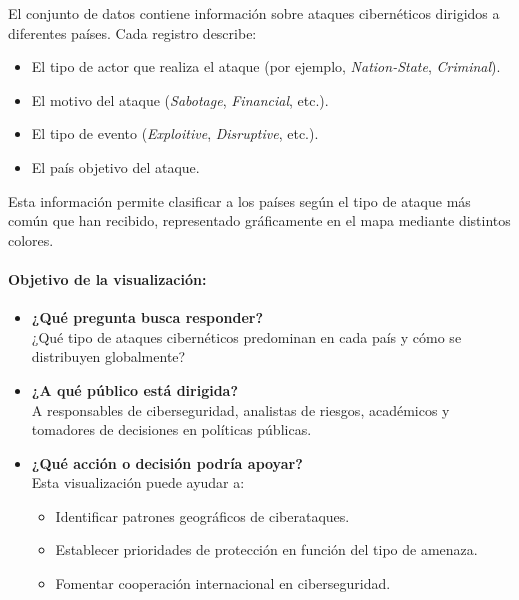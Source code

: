 \documentclass[12pt, a4paper]{article}
\begin{document}
El conjunto de datos contiene información sobre ataques cibernéticos dirigidos a diferentes países. Cada registro describe:
\begin{itemize}
    \item El tipo de actor que realiza el ataque (por ejemplo, \textit{Nation-State}, \textit{Criminal}).
    \item El motivo del ataque (\textit{Sabotage}, \textit{Financial}, etc.).
    \item El tipo de evento (\textit{Exploitive}, \textit{Disruptive}, etc.).
    \item El país objetivo del ataque.
\end{itemize}
Esta información permite clasificar a los países según el tipo de ataque más común que han recibido, representado gráficamente en el mapa mediante distintos colores.

\paragraph{Objetivo de la visualización:}

\begin{itemize}
    \item \textbf{¿Qué pregunta busca responder?} \\
    ¿Qué tipo de ataques cibernéticos predominan en cada país y cómo se distribuyen globalmente?

    \item \textbf{¿A qué público está dirigida?} \\
    A responsables de ciberseguridad, analistas de riesgos, académicos y tomadores de decisiones en políticas públicas.

    \item \textbf{¿Qué acción o decisión podría apoyar?} \\
    Esta visualización puede ayudar a:
    \begin{itemize}
        \item Identificar patrones geográficos de ciberataques.
        \item Establecer prioridades de protección en función del tipo de amenaza.
        \item Fomentar cooperación internacional en ciberseguridad.
    \end{itemize}
\end{itemize}
\end{document}
